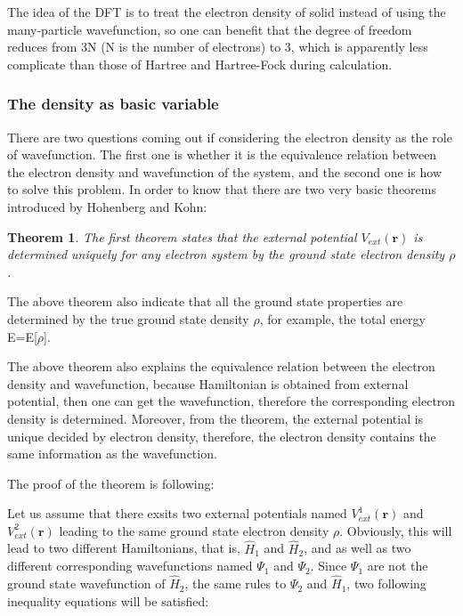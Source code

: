 \documentclass[a4paper, 12pt, titlepage,oneside,drop]{kthesis}
\newtheorem{thm}{Theorem}
\begin{document}
\noindent The idea of the DFT is to treat the electron density of solid instead of using the many-particle wavefunction, so one can
 benefit that the degree of freedom reduces from 3N (N is the number of electrons) to 3, which is apparently less complicate than 
those of Hartree and Hartree-Fock during calculation. 

\subsubsection{The density as basic variable}
\noindent There are two questions coming out if considering the electron density as the role of wavefunction. The first one is whether it
 is the equivalence relation between the electron density and wavefunction of the system, and the second one is how to solve this 
problem. In order to know that there are two very basic theorems introduced by Hohenberg and Kohn:

\begin{thm}
\label{hk1}
\noindent The first theorem states that the external potential $V_\textit{ext}(\textbf{r})$  is determined uniquely for any electron system by the ground state electron density $\rho$.
\end{thm}

\noindent The above theorem also indicate that all the ground state properties are determined by the true ground state density $\rho$,
for example, the total energy E=E[$\rho$]. 

\noindent The above theorem also explains the equivalence relation between the electron density and wavefunction, because Hamiltonian is obtained from external potential,
then one can get the wavefunction, therefore the corresponding electron density is determined. Moreover, from the theorem, the external potential is unique decided by electron
density, therefore, the electron density contains the same information as the wavefunction.

\noindent The proof of the theorem is following:

\noindent Let us assume that there exsits two external potentials named $V^{1}_\textit{ext}(\textbf{r})$ and $V^{2}_\textit{ext}(\textbf{r})$ leading to the same ground state 
electron density $\rho$. Obviously, this will lead to two different Hamiltonians, that is, $\hat{H}_{1}$ and $\hat{H}_{2}$, and as well as two different corresponding
wavefunctions named $\Psi_1$ and $\Psi_2$. Since $\Psi_1$ are not the ground state wavefunction of $\hat{H}_{2}$, the same rules to $\Psi_2$ and $\hat{H}_{1}$, two following
inequality equations will be satisfied:
\end{document}
